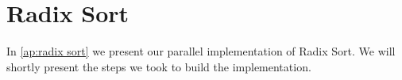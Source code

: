 \section{Radix Sort}
\label{sec:radix sort}

In \cref{ap:radix sort} we present our parallel implementation of Radix Sort.
We will shortly present the steps we took to build the implementation.
